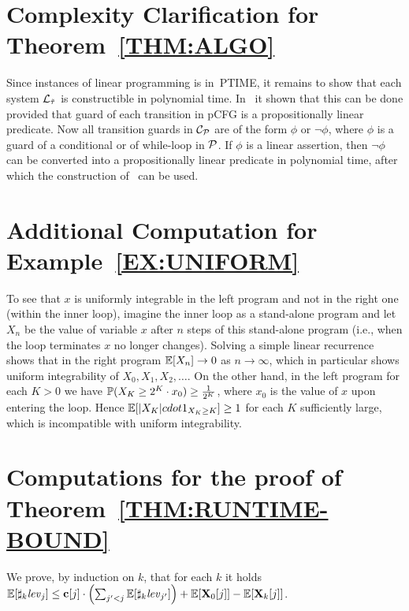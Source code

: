 \section{Complexity Clarification for Theorem~\ref{THM:ALGO}}

Since instances of linear programming is in~\textsc{PTIME}, it remains to show 
that each system $\mathcal{L}_{\tilde{\tau}}$ is constructible in polynomial 
time. In~\cite{CFNH16:prob-termination} it shown that this can be done provided 
that guard of each transition in pCFG is a propositionally linear predicate. 
Now all transition guards in $\mathcal{C}_{\mathcal{P}}$ are of the form $\phi$ or 
$\neg\phi$, where $\phi$ is a guard of a conditional or of while-loop in 
$\mathcal{P}$. If $\phi$ is a linear assertion, then $\neg\phi$ can be converted 
into a propositionally linear predicate in polynomial time, after which the 
construction of~\cite{CFNH16:prob-termination} can be used. 

\section{Additional Computation for Example~\ref{EX:UNIFORM}}

 To see that $x$ is uniformly integrable in the left program and not in the 
 right one (within the inner loop), 
 imagine the inner loop as a stand-alone program and let $X_n$ be the value of 
 variable $x$ after $n$ steps of this stand-alone program (i.e., when the loop 
 terminates $x$ no longer changes). Solving a simple linear recurrence shows 
 that in the right program $\mathbb{E}[X_n] \rightarrow 0$ as $n\rightarrow \infty$, 
 which in particular shows uniform integrability of $X_0,X_1,X_2,\dots$. On the 
 other hand, in the left program for each $K>0$ we have $\mathbb{P}(X_K \geq 
 2^K\cdot{x_0})\geq \frac{1}{2^K}$, where $x_0$ is the value of $x$ upon 
 entering the loop. Hence $\mathbb{E}[|X_K|cdot{1}_{X_K 
 	\geq K}]\geq 1$ for each $K$ sufficiently large, which is incompatible with 
 uniform integrability. 
 
\section{Computations for the proof of Theorem~\ref{THM:RUNTIME-BOUND}}

We 
prove, by induction on $k$, that for each $k$ it holds 
$\mathbb{E}[\sharp_{k}\mathit{lev}_{j}]\leq 
\mathbf{c}[j]\cdot\left(\sum_{j'<j}\mathbb{E}[\sharp_{k}\mathit{lev}_{j'}] \right)+ 
\mathbb{E}[\mathbf{X}_{0}[j]] - \mathbb{E}[\mathbf{X}_{k}[j]]$.


